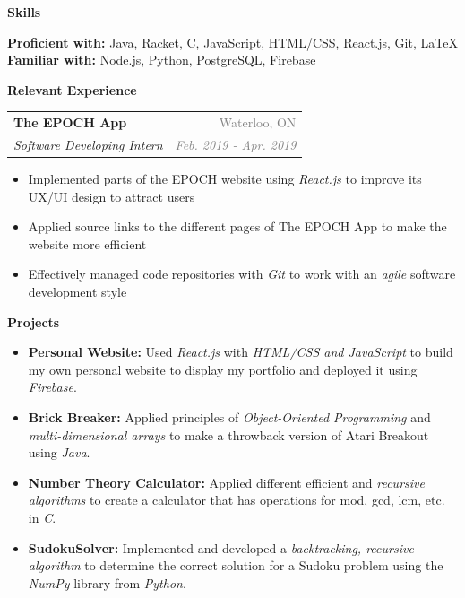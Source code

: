 \documentclass[letterpaper,10pt]{article}
\makeatletter
\newcommand{\resheading}[1]{{\large \colorbox{LightMidnightBlue}{\begin{minipage}{\textwidth}{\textbf{\textrm{#1 \vphantom{p\^{E}}}}}\end{minipage}}}}
\newcommand{\ressubheading}[4]{
\begin{tabular*}{7in}{l@{\extracolsep{\fill}}r}
        \textbf{#1} & \textcolor{gray}{#2} \\
        \textit{#3} & \textcolor{gray}{\textit{#4}} \\
\end{tabular*}\vspace{-6pt}}
\makeatother
\begin{document}
\sffamily

\hline

\vspace{2.5mm}

\resheading{Skills}

\vspace{2mm}

\textbf{Proficient with:} Java, Racket, C, JavaScript, HTML/CSS, React.js, Git, \LaTeX \\
\vspace{1.75mm}
\textbf{Familiar with:} Node.js, Python, PostgreSQL, Firebase

\vspace{2mm}

\resheading{Relevant Experience}

\vspace{2mm}

    \ressubheading{The EPOCH App}{Waterloo, ON}{Software Developing Intern}{Feb. 2019 - Apr. 2019}
        \begin{itemize}
        \setlength\itemsep{0.75mm}
            \item Implemented parts of the EPOCH website using \textit{React.js} to improve its UX/UI design to attract users
            \item Applied source links to the different pages of The EPOCH App to make the website more efficient
            \item Effectively managed code repositories with \textit{Git} to work with an \textit{agile} software development style
        \end{itemize}
        
\vspace{2mm}

\resheading{Projects}

\begin{itemize}
    \setlength\itemsep{0.5mm}
    \item \textbf{Personal Website:} Used \textit{React.js} with \textit{HTML/CSS and JavaScript} to build my own personal website to display my portfolio and deployed it using \textit{Firebase}.
    \item \textbf{Brick Breaker:} Applied principles of \textit{Object-Oriented Programming} and \textit{multi-dimensional arrays} to make a throwback version of Atari Breakout using \textit{Java}.
    \item \textbf{Number Theory Calculator:} Applied different efficient and \textit{recursive algorithms} to create a calculator that has operations for mod, gcd, lcm, etc. in \textit{C}.
    \item \textbf{SudokuSolver:} Implemented and developed a \textit{backtracking, recursive algorithm} to determine the correct solution for a Sudoku problem using the \textit{NumPy} library from \textit{Python}.
\end{itemize}
\end{document}
